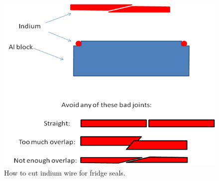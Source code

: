\begin{figure}
 \centering
 \includegraphics[scale=0.5]{./img/indium-cut.png}
 \caption{How to cut indium wire for fridge seals. \cite{zhaoindium}}
 \label{fig:indium-cut}
\end{figure}

